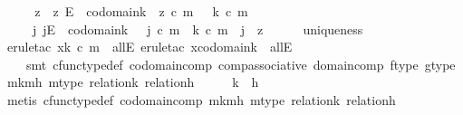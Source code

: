 \begin{isabellebody}
\ \ \isamarkupfalse%
\ \isamarkupfalse%
\ z\ \ {\isachardoublequoteopen}z{\isacharcolon}{\kern0pt}\ E\ {\isasymrightarrow}\ codomain{\isacharparenleft}{\kern0pt}k{\isacharparenright}{\kern0pt}\ {\isasymand}\ z\ {\isasymcirc}\isactrlsub c\ m\ \ {\isacharequal}{\kern0pt}\ k\ {\isasymcirc}\isactrlsub c\ m\ {\isasymand}\isanewline
\ \ \ \ {\isacharparenleft}{\kern0pt}{\isasymforall}\ j{\isachardot}{\kern0pt}\ j{\isacharcolon}{\kern0pt}E\ {\isasymrightarrow}\ codomain{\isacharparenleft}{\kern0pt}k{\isacharparenright}{\kern0pt}\ {\isasymand}\ \ j\ {\isasymcirc}\isactrlsub c\ m\ {\isacharequal}{\kern0pt}\ k\ {\isasymcirc}\isactrlsub c\ m\ {\isasymlongrightarrow}\ j\ {\isacharequal}{\kern0pt}\ z{\isacharparenright}{\kern0pt}{\isachardoublequoteclose}\isanewline
\ \ \ \ \isamarkupfalse%
\ uniqueness\ \isamarkupfalse%
\ {\isacharparenleft}{\kern0pt}erule{\isacharunderscore}{\kern0pt}tac\ x{\isacharequal}{\kern0pt}{\isachardoublequoteopen}k\ {\isasymcirc}\isactrlsub c\ m{\isachardoublequoteclose}\ \ allE{\isacharcomma}{\kern0pt}\ erule{\isacharunderscore}{\kern0pt}tac\ x{\isacharequal}{\kern0pt}{\isachardoublequoteopen}codomain{\isacharparenleft}{\kern0pt}k{\isacharparenright}{\kern0pt}{\isachardoublequoteclose}\ \ allE{\isacharcomma}{\kern0pt}\isanewline
\ \ \ \ smt\ cfunc{\isacharunderscore}{\kern0pt}type{\isacharunderscore}{\kern0pt}def\ codomain{\isacharunderscore}{\kern0pt}comp\ comp{\isacharunderscore}{\kern0pt}associative\ domain{\isacharunderscore}{\kern0pt}comp\ f{\isacharunderscore}{\kern0pt}type\ g{\isacharunderscore}{\kern0pt}type\ m{\isacharunderscore}{\kern0pt}k{\isacharunderscore}{\kern0pt}mh\ m{\isacharunderscore}{\kern0pt}type\ relation{\isacharunderscore}{\kern0pt}k\ relation{\isacharunderscore}{\kern0pt}h{\isacharparenright}{\kern0pt}\isanewline
\isanewline
\ \ \isamarkupfalse%
\ \isamarkupfalse%
\ {\isachardoublequoteopen}k\ {\isacharequal}{\kern0pt}\ h{\isachardoublequoteclose}\isanewline
\ \ \ \ \isamarkupfalse%
\ {\isacharparenleft}{\kern0pt}metis\ cfunc{\isacharunderscore}{\kern0pt}type{\isacharunderscore}{\kern0pt}def\ codomain{\isacharunderscore}{\kern0pt}comp\ m{\isacharunderscore}{\kern0pt}k{\isacharunderscore}{\kern0pt}mh\ m{\isacharunderscore}{\kern0pt}type\ relation{\isacharunderscore}{\kern0pt}k\ relation{\isacharunderscore}{\kern0pt}h{\isacharparenright}{\kern0pt}\isanewline
{}\isamarkupfalse%
%
\endisatagproof
{\isafoldproof}%
%
\isadelimproof
\isanewline

\end{isabellebody}
